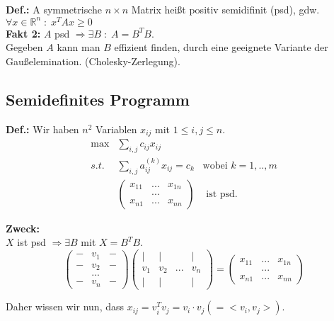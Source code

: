 \documentclass[ngerman,a4paper,11pt]{article}
\begin{document}
\textbf{Def.:}
A symmetrische $n\times n$ Matrix heißt positiv semidifinit (psd), gdw.
$\forall x \in \mathbb{R}^n \; : \; x^T A x \geq 0$\\

\textbf{Fakt 2:} $A$ psd $\Rightarrow \exists B \; : \; A = B^T B$.\\

Gegeben $A$ kann man $B$ effizient finden, durch eine geeignete Variante der Gaußelemination.
   (Cholesky-Zerlegung).

\subsection{Semidefinites Programm}

\textbf{Def.:} Wir haben $n^2$ Variablen $x_{ij}$ mit $1\leq i,j \leq n$.
   $$\begin{array}{rcr}
      \max & \underset{i,j}{\sum} c_{ij} x_{ij}\\
      s.t. & \underset{i,j}{\sum} a_{ij}^{(k)} x_{ij} = c_k & \text{wobei }k=1,..,m\\
      & \begin{pmatrix} x_{11} &...& x_{1n} \\ & ... & \\ x_{n1} & ... & x_{nn} \end{pmatrix} & \text{ ist psd}.
   \end{array}$$

\textbf{Zweck:}\\
$X$ ist psd $\Rightarrow \exists B$ mit $X = B^T B$.\\

$$
\begin{pmatrix}
-& v_1 & -\\
-& v_2 & -\\
& ... & \\
-& v_n & -
\end{pmatrix}
\begin{pmatrix}
| & | & & |\\
v_1 & v_2 & ... & v_n\\
|& | && |
\end{pmatrix}
=
\begin{pmatrix}
x_{11} & ... & x_{1n}\\
& ...& \\
x_{n1} & ... & x_{nn}
\end{pmatrix}
$$

Daher wissen wir nun, dass $x_{ij} = v_i^T v_j = v_i \cdot v_j (= < v_i, v_j >)$.\\
\end{document}
